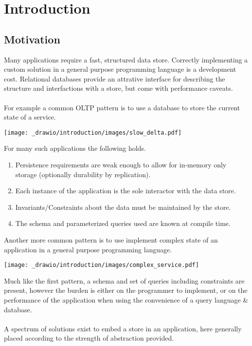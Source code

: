 \chapter{Introduction}
\section{Motivation}
Many applications require a fast, structured data store. Correctly implementing
a custom solution in a general purpose programming language is a development cost.
Relational databases provide an attrative interface for describing the structure
and interfactions with a store, but come with performance caveats.
\\
\\ For example a common OLTP pattern is to use a database to store the current state of a service.
\begin{center}
    \texttt{[image: \_drawio/introduction/images/slow\_delta.pdf]}
\end{center}
\vspace{-1cm}
\noindent For many such applications the following holds.
\begin{enumerate}
    \setlength\itemsep{0em}
    \item Persistence requirements are weak enough to allow for in-memory only storage (optionally durability by replication).
    \item Each instance of the application is the sole interactor with the data store.
    \item Invariants/Constraints about the data must be maintained by the store.
    \item The schema and parameterized queries used are known at compile time. \label{lab:known_queries_item}
\end{enumerate}
Another more common pattern is to use implement complex state of an application in a general purpose programming language.
\begin{center}
    \texttt{[image: \_drawio/introduction/images/complex\_service.pdf]}
\end{center}
Much like the first pattern, a schema and set of queries including constraints are present, however the
burden is either on the programmer to implement, or on the performance of the application when using the
convenience of a query language \& database.
\\
\\ A spectrum of solutions exist to embed a store in an application, here generally placed according to the strength of abstraction provided.
